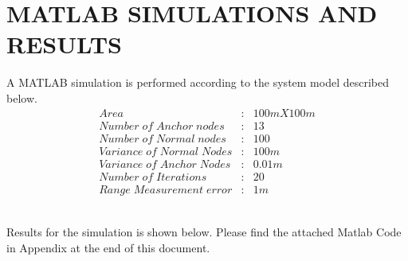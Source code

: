 \documentclass[12pt]{article}
\begin{document}
\section{MATLAB SIMULATIONS AND RESULTS}


A MATLAB simulation is performed according to the system model described below.\\
\begin{align*}
  Area		&	:&  100 m X 100 m\\
Number\;of\; Anchor\; nodes	&	:&   13\\
Number\; of\; Normal \;nodes      	&	:&   100\\
Variance\; of\; Normal\; Nodes	&	:&  100 m\\
Variance\; of\; Anchor\; Nodes	&	:& 0.01 m\\
Number \;of\; Iterations 		&	:&  20\\
Range\; Measurement\; error           &	:&  1 m
\end{align*}

\\
Results for the simulation is shown below. Please find the attached Matlab Code in Appendix at the end of this document.
\end{document}
